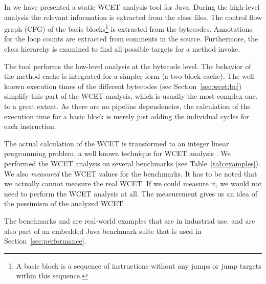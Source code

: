 In \cite{jop:wcet:jtres06} we have presented a static WCET analysis
tool for Java. During the high-level analysis the relevant
information is extracted from the class files. The control flow graph
(CFG) of the basic blocks\footnote{A basic block is a sequence of
instructions without any jumps or jump targets within this sequence.}
is extracted from the bytecodes. Annotations for the loop counts are
extracted from comments in the source. Furthermore, the class
hierarchy is examined to find all possible targets for a method
invoke.

The tool performs the low-level analysis at the bytecode level. The
behavior of the method cache is integrated for a simpler form (a two
block cache). The well known execution times of the different
bytecodes (see Section~\ref{sec:wcet:bc}) simplify this part of the
WCET analysis, which is usually the most complex one, to a great
extent. As there are no pipeline dependencies, the calculation of the
execution time for a basic block is merely just adding the individual
cycles for each instruction.

The actual calculation of the WCET is transformed to an integer
linear programming problem, a well known technique for WCET analysis
\cite{Puschner:JRTS1997,216666}. We performed the WCET analysis on
several benchmarks (see Table~\ref{tab:examples}). We also
\emph{measured} the WCET values for the benchmarks. It has to be
noted that we actually cannot measure the real WCET. If we could
measure it, we would not need to perform the WCET analysis at all.
The measurement gives us an idea of the pessimism of the analyzed
WCET.
%
\begin{table}
    \caption{WCET benchmark examples}
    \label{tab:examples}
\end{table}
%
The benchmarks  and  are real-world examples
that are in industrial use.  and  are also part
of an embedded Java benchmark suite that is used in
Section~\ref{sec:performance}.

